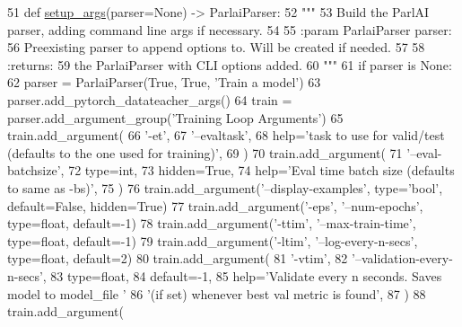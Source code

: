 \begin{DoxyCode}
51 \textcolor{keyword}{def }\hyperlink{namespaceparlai_1_1scripts_1_1train__model_a5130cce2fb2a33694a2537d800ad9e9e}{setup\_args}(parser=None) -> ParlaiParser:
52     \textcolor{stringliteral}{"""}
53 \textcolor{stringliteral}{    Build the ParlAI parser, adding command line args if necessary.}
54 \textcolor{stringliteral}{}
55 \textcolor{stringliteral}{    :param ParlaiParser parser:}
56 \textcolor{stringliteral}{        Preexisting parser to append options to. Will be created if needed.}
57 \textcolor{stringliteral}{}
58 \textcolor{stringliteral}{    :returns:}
59 \textcolor{stringliteral}{        the ParlaiParser with CLI options added.}
60 \textcolor{stringliteral}{    """}
61     \textcolor{keywordflow}{if} parser \textcolor{keywordflow}{is} \textcolor{keywordtype}{None}:
62         parser = ParlaiParser(\textcolor{keyword}{True}, \textcolor{keyword}{True}, \textcolor{stringliteral}{'Train a model'})
63     parser.add\_pytorch\_datateacher\_args()
64     train = parser.add\_argument\_group(\textcolor{stringliteral}{'Training Loop Arguments'})
65     train.add\_argument(
66         \textcolor{stringliteral}{'-et'},
67         \textcolor{stringliteral}{'--evaltask'},
68         help=\textcolor{stringliteral}{'task to use for valid/test (defaults to the one used for training)'},
69     )
70     train.add\_argument(
71         \textcolor{stringliteral}{'--eval-batchsize'},
72         type=int,
73         hidden=\textcolor{keyword}{True},
74         help=\textcolor{stringliteral}{'Eval time batch size (defaults to same as -bs)'},
75     )
76     train.add\_argument(\textcolor{stringliteral}{'--display-examples'}, type=\textcolor{stringliteral}{'bool'}, default=\textcolor{keyword}{False}, hidden=\textcolor{keyword}{True})
77     train.add\_argument(\textcolor{stringliteral}{'-eps'}, \textcolor{stringliteral}{'--num-epochs'}, type=float, default=-1)
78     train.add\_argument(\textcolor{stringliteral}{'-ttim'}, \textcolor{stringliteral}{'--max-train-time'}, type=float, default=-1)
79     train.add\_argument(\textcolor{stringliteral}{'-ltim'}, \textcolor{stringliteral}{'--log-every-n-secs'}, type=float, default=2)
80     train.add\_argument(
81         \textcolor{stringliteral}{'-vtim'},
82         \textcolor{stringliteral}{'--validation-every-n-secs'},
83         type=float,
84         default=-1,
85         help=\textcolor{stringliteral}{'Validate every n seconds. Saves model to model\_file '}
86         \textcolor{stringliteral}{'(if set) whenever best val metric is found'},
87     )
88     train.add\_argument(

\end{DoxyCode}
